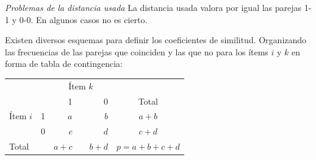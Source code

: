 \documentclass[spanish]{beamer}
\begin{document}
\begin{frame}{\textit{Problemas de la distancia usada}}
La distancia usada valora por igual las parejas 1-1 y 0-0. En algunos casos no es cierto.\break 

Existen diversos esquemas para definir los coeficientes de similitud. Organizando las frecuencias de las parejas que coinciden y las que no para los ítems $i$ y $k$ en forma de tabla de contingencia:

\begin{table}[H]
  \centering
\resizebox{7cm}{!} {
  \begin{tabular}{llrrrrr}
    \toprule
\multicolumn{2}{l}{\multirow{}{}{}}& \multicolumn{3}{c}{Ítem $k$} & \multicolumn{2}{c}{} \\\cmidrule{3-5}
\multicolumn{2}{l}{}                  & 1        &       & 0       & \multicolumn{2}{c}{{Total}}                        \\
\midrule
{Ítem $i$}       & 1      & $a$        &       & $b$       & \multicolumn{2}{c}{$a+b$}                     \\
                              & 0      & $c$        &       & $d$       & \multicolumn{2}{c}{$c+d$}                     \\ \midrule
\multicolumn{2}{l}{Total}            & $a+c$      &       & $b+d$     & \multicolumn{2}{c}{$p=a+b+c+d$}\\
\bottomrule
\end{tabular}
}
\end{table}

\end{frame}
\end{document}
